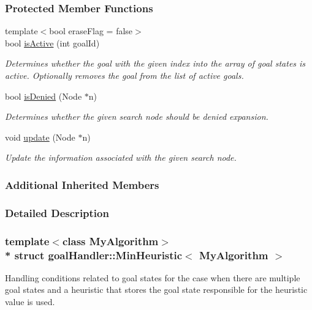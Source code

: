 \subsubsection*{Protected Member Functions}
\begin{DoxyCompactItemize}
\item 
{\footnotesize template$<$bool erase\+Flag = false$>$ }\\bool \hyperlink{structgoalHandler_1_1MinHeuristic_a70b2fe4e8f3eadd94a16de182d85e605}{is\+Active} (int goal\+Id)
\begin{DoxyCompactList}\small\item\em Determines whether the goal with the given index into the array of goal states is active. Optionally removes the goal from the list of active goals. \end{DoxyCompactList}\item 
bool \hyperlink{structgoalHandler_1_1MinHeuristic_a6d7360ac5047eede5cd0f5c3079a3317}{is\+Denied} (Node $\ast$n)
\begin{DoxyCompactList}\small\item\em Determines whether the given search node should be denied expansion. \end{DoxyCompactList}\item 
void \hyperlink{structgoalHandler_1_1MinHeuristic_a095d1a85a72d812a1832ab492fd17389}{update} (Node $\ast$n)
\begin{DoxyCompactList}\small\item\em Update the information associated with the given search node. \end{DoxyCompactList}\end{DoxyCompactItemize}
\subsubsection*{Additional Inherited Members}


\subsubsection{Detailed Description}
\subsubsection*{template$<$class My\+Algorithm$>$\\*
struct goal\+Handler\+::\+Min\+Heuristic$<$ My\+Algorithm $>$}

Handling conditions related to goal states for the case when there are multiple goal states and a heuristic that stores the goal state responsible for the heuristic value is used. 


